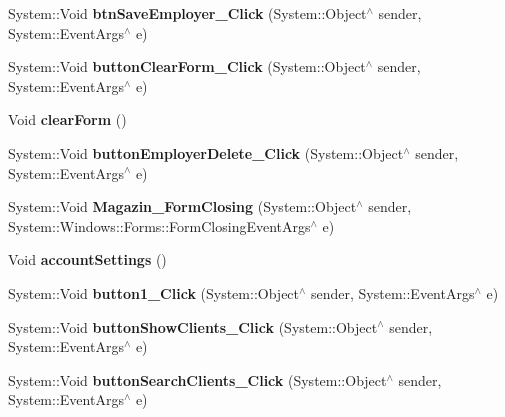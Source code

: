 \begin{DoxyCompactItemize}
\hypertarget{class_magazyn_1_1_magazin_a4d068e231b209d741fb79d5a8b0d32a0}{}\label{class_magazyn_1_1_magazin_a4d068e231b209d741fb79d5a8b0d32a0} 
System\+::\+Void {\bfseries btn\+Save\+Employer\+\_\+\+Click} (System\+::\+Object$^\wedge$ sender, System\+::\+Event\+Args$^\wedge$ e)
\item 
\hypertarget{class_magazyn_1_1_magazin_a9971c31701c92ea5fcec653dabd0c3d6}{}\label{class_magazyn_1_1_magazin_a9971c31701c92ea5fcec653dabd0c3d6} 
System\+::\+Void {\bfseries button\+Clear\+Form\+\_\+\+Click} (System\+::\+Object$^\wedge$ sender, System\+::\+Event\+Args$^\wedge$ e)
\item 
\hypertarget{class_magazyn_1_1_magazin_ac906afd7e120d985b4af877361104411}{}\label{class_magazyn_1_1_magazin_ac906afd7e120d985b4af877361104411} 
Void {\bfseries clear\+Form} ()
\item 
\hypertarget{class_magazyn_1_1_magazin_a0b48230c0e70b52f31c94dcef82a5cc0}{}\label{class_magazyn_1_1_magazin_a0b48230c0e70b52f31c94dcef82a5cc0} 
System\+::\+Void {\bfseries button\+Employer\+Delete\+\_\+\+Click} (System\+::\+Object$^\wedge$ sender, System\+::\+Event\+Args$^\wedge$ e)
\item 
\hypertarget{class_magazyn_1_1_magazin_a3bf8949bf6505ac5f26b4a96c94190ab}{}\label{class_magazyn_1_1_magazin_a3bf8949bf6505ac5f26b4a96c94190ab} 
System\+::\+Void {\bfseries Magazin\+\_\+\+Form\+Closing} (System\+::\+Object$^\wedge$ sender, System\+::\+Windows\+::\+Forms\+::\+Form\+Closing\+Event\+Args$^\wedge$ e)
\item 
\hypertarget{class_magazyn_1_1_magazin_ace66b19ac457b029ecb6bf3eb5b4732e}{}\label{class_magazyn_1_1_magazin_ace66b19ac457b029ecb6bf3eb5b4732e} 
Void {\bfseries account\+Settings} ()
\item 
\hypertarget{class_magazyn_1_1_magazin_a2b139e400b26519295b79da050883305}{}\label{class_magazyn_1_1_magazin_a2b139e400b26519295b79da050883305} 
System\+::\+Void {\bfseries button1\+\_\+\+Click} (System\+::\+Object$^\wedge$ sender, System\+::\+Event\+Args$^\wedge$ e)
\item 
\hypertarget{class_magazyn_1_1_magazin_a57fb0148d5d70a0e9dc970d6016c7e73}{}\label{class_magazyn_1_1_magazin_a57fb0148d5d70a0e9dc970d6016c7e73} 
System\+::\+Void {\bfseries button\+Show\+Clients\+\_\+\+Click} (System\+::\+Object$^\wedge$ sender, System\+::\+Event\+Args$^\wedge$ e)
\item 
\hypertarget{class_magazyn_1_1_magazin_add4f3f7e4935b77ffd9c1107d13c04ee}{}\label{class_magazyn_1_1_magazin_add4f3f7e4935b77ffd9c1107d13c04ee} 
System\+::\+Void {\bfseries button\+Search\+Clients\+\_\+\+Click} (System\+::\+Object$^\wedge$ sender, System\+::\+Event\+Args$^\wedge$ e)

\end{DoxyCompactItemize}
